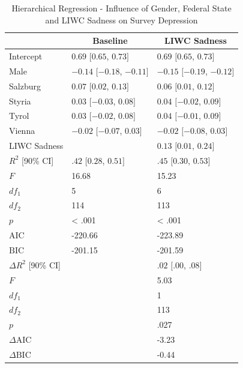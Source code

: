 \documentclass[
  english,
  jou,floatsintext]{apa7}
\begin{document}
\begin{table}[b]

\begin{center}
\begin{threeparttable}

\caption{\label{tab:table-depr-liwc}Hierarchical Regression - Influence of Gender, Federal State and LIWC Sadness on Survey Depression}

\small{

\begin{tabular}{lll}
\toprule
 & \multicolumn{1}{c}{Baseline} & \multicolumn{1}{c}{LIWC Sadness}\\
\midrule
Intercept & $0.69$ $[0.65$, $0.73]$ & $0.69$ $[0.65$, $0.73]$\\
Male & $-0.14$ $[-0.18$, $-0.11]$ & $-0.15$ $[-0.19$, $-0.12]$\\
Salzburg & $0.07$ $[0.02$, $0.13]$ & $0.06$ $[0.01$, $0.12]$\\
Styria & $0.03$ $[-0.03$, $0.08]$ & $0.04$ $[-0.02$, $0.09]$\\
Tyrol & $0.03$ $[-0.02$, $0.08]$ & $0.04$ $[-0.01$, $0.09]$\\
Vienna & $-0.02$ $[-0.07$, $0.03]$ & $-0.02$ $[-0.08$, $0.03]$\\
LIWC Sadness &  & $0.13$ $[0.01$, $0.24]$\\
$R^2$ [90\% CI] & $.42$ $[0.28$, $0.51]$ & $.45$ $[0.30$, $0.53]$\\
$F$ & 16.68 & 15.23\\
$df_1$ & 5 & 6\\
$df_2$ & 114 & 113\\
$p$ & < .001 & < .001\\
$\mathrm{AIC}$ & -220.66 & -223.89\\
$\mathrm{BIC}$ & -201.15 & -201.59\\
$\Delta R^2$ [90\% CI] &  & $.02$ $[.00$, $.08]$\\
$F$ &  & 5.03\\
$df_1$ &  & 1\\
$df_2$ &  & 113\\
$p$ &  & .027\\
$\Delta \mathrm{AIC}$ &  & -3.23\\
$\Delta \mathrm{BIC}$ &  & -0.44\\
\bottomrule
\end{tabular}

}

\end{threeparttable}
\end{center}

\end{table}
\end{document}
